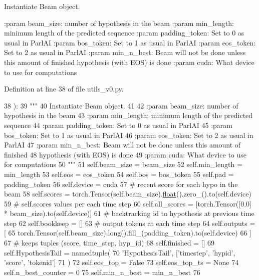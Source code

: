 \begin{DoxyVerb}Instantiate Beam object.

:param beam_size: number of hypothesis in the beam
:param min_length: minimum length of the predicted sequence
:param padding_token: Set to 0 as usual in ParlAI
:param bos_token: Set to 1 as usual in ParlAI
:param eos_token: Set to 2 as usual in ParlAI
:param min_n_best: Beam will not be done unless this amount of finished
           hypothesis (with EOS) is done
:param cuda: What device to use for computations
\end{DoxyVerb}
 

Definition at line 38 of file utils\+\_\+v0.\+py.


\begin{DoxyCode}
38     ):
39         \textcolor{stringliteral}{"""}
40 \textcolor{stringliteral}{        Instantiate Beam object.}
41 \textcolor{stringliteral}{}
42 \textcolor{stringliteral}{        :param beam\_size: number of hypothesis in the beam}
43 \textcolor{stringliteral}{        :param min\_length: minimum length of the predicted sequence}
44 \textcolor{stringliteral}{        :param padding\_token: Set to 0 as usual in ParlAI}
45 \textcolor{stringliteral}{        :param bos\_token: Set to 1 as usual in ParlAI}
46 \textcolor{stringliteral}{        :param eos\_token: Set to 2 as usual in ParlAI}
47 \textcolor{stringliteral}{        :param min\_n\_best: Beam will not be done unless this amount of finished}
48 \textcolor{stringliteral}{                           hypothesis (with EOS) is done}
49 \textcolor{stringliteral}{        :param cuda: What device to use for computations}
50 \textcolor{stringliteral}{        """}
51         self.beam\_size = beam\_size
52         self.min\_length = min\_length
53         self.eos = eos\_token
54         self.bos = bos\_token
55         self.pad = padding\_token
56         self.device = cuda
57         \textcolor{comment}{# recent score for each hypo in the beam}
58         self.scores = torch.Tensor(self.beam\_size).\hyperlink{namespaceprojects_1_1controllable__dialogue_1_1make__control__dataset_aa2b7207688c641dbc094ab44eca27113}{float}().zero\_().to(self.device)
59         \textcolor{comment}{# self.scores values per each time step}
60         self.all\_scores = [torch.Tensor([0.0] * beam\_size).to(self.device)]
61         \textcolor{comment}{# backtracking id to hypothesis at previous time step}
62         self.bookkeep = []
63         \textcolor{comment}{# output tokens at each time step}
64         self.outputs = [
65             torch.Tensor(self.beam\_size).long().fill\_(padding\_token).to(self.device)
66         ]
67         \textcolor{comment}{# keeps tuples (score, time\_step, hyp\_id)}
68         self.finished = []
69         self.HypothesisTail = namedtuple(
70             \textcolor{stringliteral}{'HypothesisTail'}, [\textcolor{stringliteral}{'timestep'}, \textcolor{stringliteral}{'hypid'}, \textcolor{stringliteral}{'score'}, \textcolor{stringliteral}{'tokenid'}]
71         )
72         self.eos\_top = \textcolor{keyword}{False}
73         self.eos\_top\_ts = \textcolor{keywordtype}{None}
74         self.n\_best\_counter = 0
75         self.min\_n\_best = min\_n\_best
76 
\end{DoxyCode}


